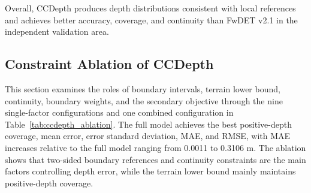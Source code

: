 \documentclass[authoryear,preprint,12pt]{elsarticle}
\begin{document}
Overall, CCDepth produces depth distributions consistent with local references and achieves better accuracy, coverage, and continuity than FwDET v2.1 in the independent validation area.

\subsection{Constraint Ablation of CCDepth}\label{sec:ccdepth_constraint_ablation}

This section examines the roles of boundary intervals, terrain lower bound, continuity, boundary weights, and the secondary objective through the nine single-factor configurations and one combined configuration in Table~\ref{tab:ccdepth_ablation}. The full model achieves the best positive-depth coverage, mean error, error standard deviation, MAE, and RMSE, with MAE increases relative to the full model ranging from 0.0011 to 0.3106 m. The ablation shows that two-sided boundary references and continuity constraints are the main factors controlling depth error, while the terrain lower bound mainly maintains positive-depth coverage.
\end{document}
